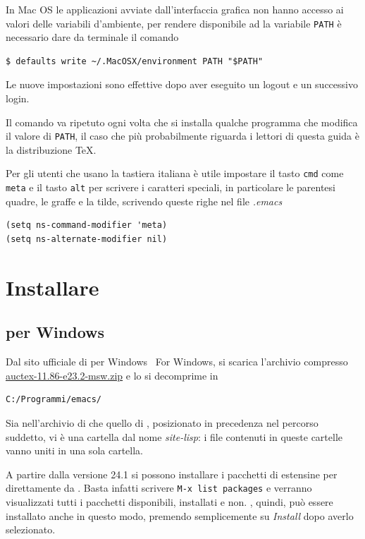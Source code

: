 \documentclass[11pt,a4paper]{article}
\begin{document}
In Mac OS le applicazioni avviate dall'interfaccia grafica non hanno
accesso ai valori delle variabili d'ambiente, per rendere disponibile
ad \emacs{} la variabile \texttt{PATH} è necessario dare da terminale
il comando
\begin{Verbatim}
$ defaults write ~/.MacOSX/environment PATH "$PATH"
\end{Verbatim}
Le nuove impostazioni sono effettive dopo aver eseguito un logout e un
successivo login.

Il comando va ripetuto ogni volta che si installa qualche programma
che modifica il valore di \texttt{PATH}, il caso che più probabilmente
riguarda i lettori di questa guida è la distribuzione \TeX{}.

Per gli utenti che usano la tastiera italiana è utile impostare il
tasto \texttt{cmd} come \texttt{meta} e il tasto \texttt{alt} per
scrivere i caratteri speciali, in particolare le parentesi quadre, le
graffe e la tilde, scrivendo queste righe nel file \emph{.emacs}
\begin{Verbatim}
(setq ns-command-modifier 'meta)
(setq ns-alternate-modifier nil)
\end{Verbatim}

\section{Installare \auctex}
\label{sec:installauc}

\subsection{\auctex{} per Windows}
\label{sec:auctexwin}

Dal sito ufficiale di \auctex{} per Windows %
%
{\auctex\ For Windows}, %
si scarica l'archivio compresso %
\href{http://ftp.gnu.org/pub/gnu/auctex/auctex-11.86-e23.2-msw.zip}%
{\textsf{auctex-11.86-e23.2-msw.zip}} e lo si decomprime in
\begin{Verbatim}
C:/Programmi/emacs/
\end{Verbatim}

Sia nell'archivio di \auctex{} che quello di \emacs, posizionato in precedenza
nel percorso suddetto, vi è una cartella dal nome \emph{site-lisp}: i file
contenuti in queste cartelle vanno uniti in una sola cartella.


A partire dalla versione 24.1 si possono installare i pacchetti di estensine
per \emacs{} direttamente da \emacs{}. Basta infatti scrivere 
\verb!M-x list packages! e verranno visualizzati tutti i pacchetti disponibili, installati e
non. \auctex, quindi, può essere installato anche in questo modo, premendo
semplicemente su \emph{Install} dopo averlo selezionato.
\end{document}
